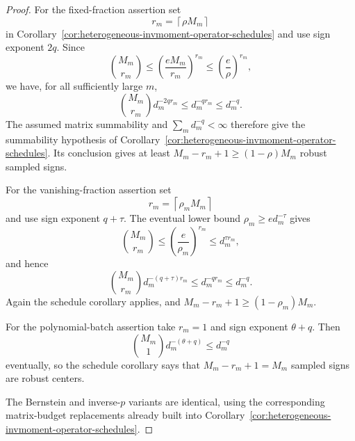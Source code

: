 \documentclass[11pt]{amsart}
\numberwithin{equation}{section}
\theoremstyle{definition}
\theoremstyle{remark}
\begin{document}
\begin{proof}
For the fixed-fraction assertion set
\[
  r_m=\left\lceil \rho M_m\right\rceil
\]
in Corollary~\ref{cor:heterogeneous-invmoment-operator-schedules} and use sign
exponent \(2q\).  Since
\[
  \binom{M_m}{r_m}
  \le \left(\frac{eM_m}{r_m}\right)^{r_m}
  \le \left(\frac e\rho\right)^{r_m},
\]
we have, for all sufficiently large \(m\),
\[
  \binom{M_m}{r_m}d_m^{-2q r_m}
  \le d_m^{-q r_m}
  \le d_m^{-q}.
\]
The assumed matrix summability and \(\sum_m d_m^{-q}<\infty\) therefore give the
summability hypothesis of
Corollary~\ref{cor:heterogeneous-invmoment-operator-schedules}.  Its conclusion
gives at least \(M_m-r_m+1\ge(1-\rho)M_m\) robust sampled signs.

For the vanishing-fraction assertion set
\[
  r_m=\left\lceil \rho_m M_m\right\rceil
\]
and use sign exponent \(q+\tau\).  The eventual lower bound
\(\rho_m\ge e d_m^{-\tau}\) gives
\[
  \binom{M_m}{r_m}
  \le \left(\frac e{\rho_m}\right)^{r_m}
  \le d_m^{\tau r_m},
\]
and hence
\[
  \binom{M_m}{r_m}d_m^{-(q+\tau)r_m}
  \le d_m^{-q r_m}
  \le d_m^{-q}.
\]
Again the schedule corollary applies, and
\(M_m-r_m+1\ge(1-\rho_m)M_m\).

For the polynomial-batch assertion take \(r_m=1\) and sign exponent
\(\theta+q\).  Then
\[
  \binom{M_m}{1}d_m^{-(\theta+q)}
  \le d_m^{-q}
\]
eventually, so the schedule corollary says that
\(M_m-r_m+1=M_m\) sampled signs are robust centers.

The Bernstein and inverse-\(p\) variants are identical, using the corresponding
matrix-budget replacements already built into
Corollary~\ref{cor:heterogeneous-invmoment-operator-schedules}.
\end{proof}
\end{document}

